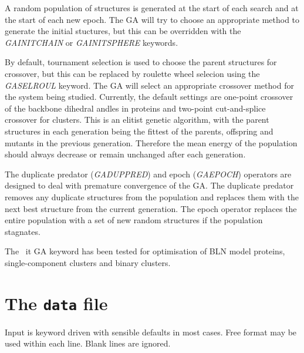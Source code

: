 \documentclass[12pt,a4paper,dvips]{article}
\begin{document}
A random population of structures is generated at the
start of each search and at the start of each new epoch. The GA will try to
choose an appropriate method to generate the initial stuctures, but this can be
overridden with the {\it GAINITCHAIN} or {\it GAINITSPHERE} keywords.

By default, tournament selection is used
to choose the parent structures for crossover, but this can be replaced by
roulette wheel selecion using the {\it GASELROUL} keyword. The GA will select an
appropriate crossover method for the system being studied. Currently, the default settings are one-point
crossover of the backbone dihedral andles in proteins and two-point
cut-and-splice crossover for clusters. This is an elitist genetic algorithm,
with the parent structures in each generation being the fittest of the parents, offspring and mutants in the
previous generation. Therefore the mean energy of the population should always
decrease or remain unchanged after each generation.

The duplicate predator ({\it GADUPPRED}) and epoch ({\it GAEPOCH}) operators are
designed to deal with premature convergence of the GA.  The duplicate predator
removes any duplicate structures from the population and replaces them with the
next best structure from the current generation. The epoch operator replaces the
entire population with a set of new random structures if the population
stagnates.

The {\ it GA} keyword has been tested for optimisation of BLN model proteins,
single-component clusters and binary clusters.

\section{The {\tt data} file}

Input is keyword driven with sensible defaults in most cases. 
Free format may be used within each line. Blank lines are ignored.
\end{document}
